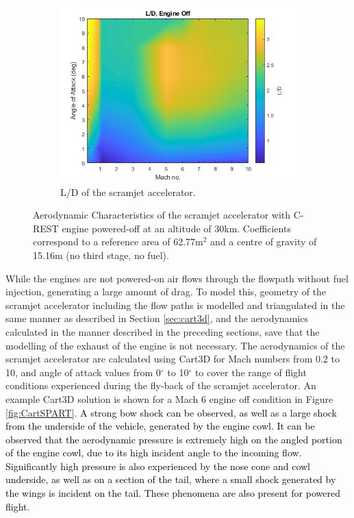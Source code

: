 \begin{figure}[!ht]
\begin{subfigure}{.5\textwidth}
		\centering
		\includegraphics[width=0.99\linewidth]{figures/3_vehicle_design/LD}
		\caption{L/D of the scramjet accelerator.}
		\label{fig:LD}
	\end{subfigure}
	\caption{Aerodynamic Characteristics of the scramjet accelerator with C-REST engine powered-off at an altitude of 30km. Coefficients correspond to a reference area of 62.77m$^2$ and a centre of gravity of 15.16m (no third stage, no fuel).} %
	\label{fig:aero1}
\end{figure}
 While the engines are not powered-on air flows through the flowpath without fuel injection, generating a large amount of drag. To model this, geometry of the scramjet accelerator including the flow paths is modelled and triangulated in the same manner as described in Section \ref{sec:cart3d}, and the aerodynamics calculated in the manner described in the preceding sections, save that the modelling of the exhaust of the engine is not necessary.
The aerodynamics of the scramjet accelerator are calculated using Cart3D for Mach numbers from 0.2 to 10, and angle of attack values from 0$^\circ$ to 10$^\circ$ to cover the range of flight conditions experienced during the fly-back of the scramjet accelerator.  An example Cart3D solution is shown for a Mach 6 engine off condition in Figure \ref{fig:CartSPART}. \textcolor{black}{A strong bow shock can be observed, as well as a large shock from the underside of the vehicle, generated by the engine cowl. It can be observed that the aerodynamic pressure is extremely high on the angled portion of the engine cowl, due to its high incident angle to the incoming flow. Significantly high pressure is also experienced by the nose cone and cowl underside, as well as on a section of the tail, where a small shock generated by the wings is incident on the tail. These phenomena are also present for powered flight.}

